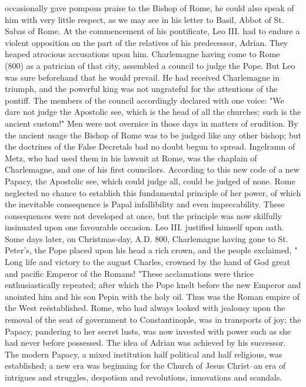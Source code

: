 occasionally gave pompous praise to the Bishop of Rome, he could also speak of him with very little respect, as we may see in his letter to Basil, Abbot of St. Sabas of Rome. At the commencement of his pontificate, Leo III. had to endure a violent opposition on the part of the relatives of his predecessor, Adrian. They heaped atrocious accusations upon him. Charlemagne having come to Rome (800) as a patrician of that city, assembled a council to judge the Pope. But Leo was sure beforehand that he would prevail. He had received Charlemagne in triumph, and the powerful king was not ungrateful for the attentions of the pontiff. The members of the council accordingly declared with one voice: "We dare not judge the Apostolic see, which is the head of all the churches; such is the ancient custom!" Men were not overnice in those days in matters of erudition. By the ancient usage the Bishop of Rome was to be judged like any other bishop; but the doctrines of the False Decretals bad no doubt begun to spread. Ingelramn of Metz, who had used them in his lawsuit at Rome, was the chaplain of Charlemagne, and one of his first councilors. According to this new code of a new Papacy, the Apostolic see, which could judge all, could be judged of none. Rome neglected no chance to establish this fundamental principle of her power, of which the inevitable consequence is Papal infallibility and even impeccability. These consequences were not developed at once, but the principle was now skilfully insinuated upon one favourable occasion. Leo III. justified himself upon oath. Some days later, on Christmas-day, A.D. 800, Charlemagne having gone to St. Peter's, the Pope placed upon his head a rich crown, and the people exclaimed, " Long life and victory to the august Charles, crowned by the hand of God great and pacific Emperor of the Romans! "These acclamations were thrice enthusiastically repeated; after which the Pope knelt before the new Emperor and anointed him and his son Pepin with the holy oil. Thus was the Roman empire of the West reëstablished. Rome, who had always looked with jealousy upon the removal of the seat of government to Constantinople, was in transports of joy; the Papacy, pandering to her secret lusts, was now invested with power such as she had never before possessed. The idea of Adrian was achieved by his successor. The modern Papacy, a mixed institution half political and half religious, was established; a new era was beginning for the Church of Jesus Christ--an era of intrigues and struggles, despotism and revolutions, innovations and scandals.


